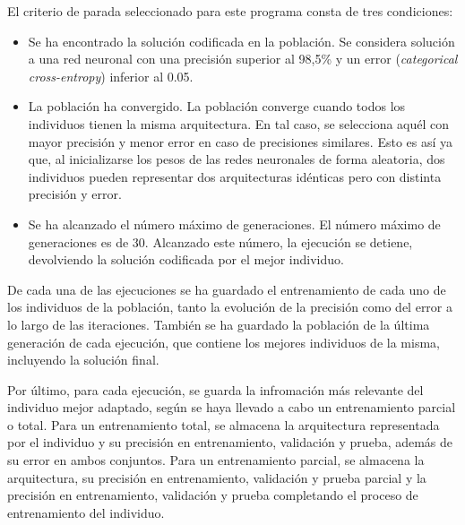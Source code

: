 \documentclass[spanish,a4paper,12pt,twoside]{report}
\begin{document}
  El criterio de parada seleccionado para este programa consta de tres condiciones: \par
  \begin{itemize}
    \item Se ha encontrado la solución codificada en la población. Se considera solución a una red neuronal con una precisión superior al 98,5\% y un error (\emph{categorical cross-entropy}) inferior al 0.05.
    \item La población ha convergido. La población converge cuando todos los individuos tienen la misma arquitectura. En tal caso, se selecciona aquél con mayor precisión y menor error en caso de precisiones similares. Esto es así ya que, al inicializarse los pesos de las redes neuronales de forma aleatoria, dos individuos pueden representar dos arquitecturas idénticas pero con distinta precisión y error.
    \item Se ha alcanzado el número máximo de generaciones. El número máximo de generaciones es de 30. Alcanzado este número, la ejecución se detiene, devolviendo la solución codificada por el mejor individuo.
  \end{itemize}
  De cada una de las ejecuciones se ha guardado el entrenamiento de cada uno de los individuos de la población, tanto la evolución de la precisión como del error a lo largo de las iteraciones. También se ha guardado la población de la última generación de cada ejecución, que contiene los mejores individuos de la misma, incluyendo la solución final. \par
  Por último, para cada ejecución, se guarda la infromación más relevante del individuo mejor adaptado, según se haya llevado a cabo un entrenamiento parcial o total. Para un entrenamiento total, se almacena la arquitectura representada por el individuo y su precisión en entrenamiento, validación y prueba, además de su error en ambos conjuntos. Para un entrenamiento parcial, se almacena la arquitectura, su precisión en entrenamiento, validación y prueba parcial y la precisión en entrenamiento, validación y prueba completando el proceso de entrenamiento del individuo. \par
\end{document}
